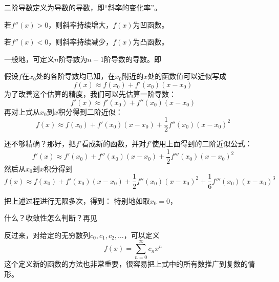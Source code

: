 \documentclass[CJK]{beamer}
\begin{document}
\begin{frame}
\bch
二阶导数定义为导数的导数，即“斜率的变化率”。

若$f''(x)>0$，则斜率持续增大，$f(x)$为凹函数。

若$f''(x)<0$，则斜率持续减少，$f(x)$为凸函数。


\ech
\end{frame}

\begin{frame}
\bch
一般地，可定义$n$阶导数为$n-1$阶导数的导数。即


\ech
\end{frame}

\begin{frame}
\bch

假设$f$在$x_0$处的各阶导数均已知，在$x_0$附近的$x$处的函数值可以近似写成
$$f(x) \approx f(x_0) + f'(x_0) (x-x_0)$$
为了改善这个估算的精度，我们可以先估算一阶导数：
$$f'(x) \approx f'(x_0) + f''(x_0)(x-x_0)$$
再对上式从$x_0$到$x$积分得到二阶近似：
$$f(x) \approx f(x_0) + f'(x_0)(x-x_0) + \frac{1}{2}f''(x_0)(x-x_0)^2$$
\ech
\end{frame}

\begin{frame}
\bch
还不够精确？那好，把$f'$看成新的函数，并对$f'$使用上面得到的二阶近似公式：
$$ f'(x) \approx f'(x_0) + f''(x_0)(x-x_0) + \frac{1}{2}f'''(x_0)(x-x_0)^2$$
然后从$x_0$到$x$积分得到
$$f(x) \approx f(x_0) + f'(x_0)(x-x_0) + \frac{1}{2}f''(x_0)(x-x_0)^2 + \frac{1}{6}f'''(x_0) (x-x_0)^3$$
\ech
\end{frame}


\begin{frame}
\bch
把上述过程进行无限多次，得到：
特别地如取$x_0=0$，

\skipline

什么？收敛性怎么判断？再见\bye
\ech
\end{frame}


\begin{frame}
\bch
反过来，对给定的无穷数列$c_0, c_1, c_2, \ldots$，可以定义
$$ f(x) = \sum_{n=0}^\infty c_n x^n $$
这个定义新的函数的方法也非常重要，很容易把上式中的所有数推广到复数的情形。
\ech
\end{frame}
\end{document}
